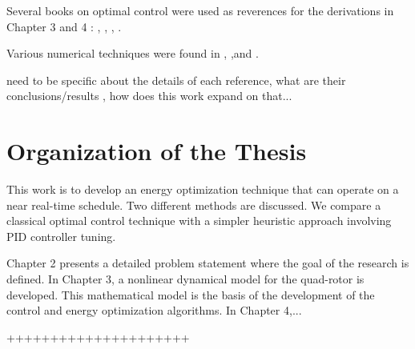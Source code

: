 Several books on optimal control were used as reverences for the derivations in Chapter 3 and 4 : \cite{lewis2012optimal} , \cite{BrysonHo69}, \cite{locatelli2001optimal}, \cite{athans2006optimal}.

Various numerical techniques were found in \cite{richard1988douglas}, \cite{rao2009engineering},and \cite{keller1992numerical}.

{\color{red} need to be specific about the details of each reference, what are their conclusions/results , how does this work expand on that...} 


\section{Organization of the Thesis}

This work is to develop an energy optimization technique that can operate on a near real-time schedule. Two different methods are discussed. We compare a classical optimal control technique with a simpler heuristic approach involving PID controller tuning. 

Chapter 2 presents a detailed problem statement where the goal of the research is defined. In Chapter 3, a nonlinear dynamical model for the quad-rotor is developed. This mathematical model is the basis of the development of the control and energy optimization algorithms. {\color{red}In Chapter 4,...}


{\color{red}    +++++++++++++++++++++}

